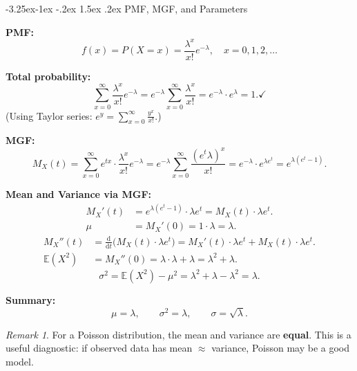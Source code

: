 \documentclass{article}
\makeatletter
\theoremstyle{remark}
\newtheorem*{remark}{Remark}
\newlength{\subsecindent}
\renewcommand\subsection{\@startsection{subsection}{2}{\subsecindent}%
  {-3.25ex\@plus -1ex \@minus -.2ex}%
  {1.5ex \@plus .2ex}%
  {\normalfont\large\bfseries}}
\newenvironment{sub}{%
  \begin{list}{}{%
    \setlength{\leftmargin}{4em}%
    \setlength{\rightmargin}{0pt}%
    \setlength{\topsep}{0pt}%
    \setlength{\partopsep}{0pt}%
    \setlength{\parsep}{\parskip}%
    \setlength{\itemsep}{\parskip}%
  }\item\relax
}{\end{list}}
\newcommand{\E}{\mathbb{E}}
\makeatother
\begin{document}
\subsection{PMF, MGF, and Parameters}
\begin{sub}

\textbf{PMF:}
\begin{equation}
  f(x) = P(X = x) = \frac{\lambda^x}{x!} e^{-\lambda}, \quad x = 0, 1, 2, \ldots
  \label{eq:pois-pmf}
\end{equation}

\textbf{Total probability:}
\[
  \sum_{x=0}^{\infty} \frac{\lambda^x}{x!} e^{-\lambda}
  = e^{-\lambda} \sum_{x=0}^{\infty} \frac{\lambda^x}{x!}
  = e^{-\lambda} \cdot e^{\lambda} = 1. \checkmark
\]
(Using Taylor series: $e^y = \sum_{x=0}^{\infty} \frac{y^x}{x!}$.)

\textbf{MGF:}
\begin{equation}
  M_X(t) = \sum_{x=0}^{\infty} e^{tx} \cdot \frac{\lambda^x}{x!} e^{-\lambda}
         = e^{-\lambda} \sum_{x=0}^{\infty} \frac{(e^t \lambda)^x}{x!}
         = e^{-\lambda} \cdot e^{\lambda e^t}
         = e^{\lambda(e^t - 1)}.
  \label{eq:pois-mgf}
\end{equation}

\textbf{Mean and Variance via MGF:}
\begin{align*}
  M_X'(t) &= e^{\lambda(e^t - 1)} \cdot \lambda e^t = M_X(t) \cdot \lambda e^t. \\
  \mu &= M_X'(0) = 1 \cdot \lambda = \lambda.
\end{align*}
\begin{align*}
  M_X''(t) &= \frac{\mathrm{d}}{\mathrm{d}t}\bigl(M_X(t) \cdot \lambda e^t\bigr)
            = M_X'(t) \cdot \lambda e^t + M_X(t) \cdot \lambda e^t. \\
  \E(X^2) &= M_X''(0) = \lambda \cdot \lambda + \lambda = \lambda^2 + \lambda.
\end{align*}
\[
  \sigma^2 = \E(X^2) - \mu^2 = \lambda^2 + \lambda - \lambda^2 = \lambda.
\]

\textbf{Summary:}
\begin{equation}
  \boxed{\mu = \lambda, \qquad \sigma^2 = \lambda, \qquad \sigma = \sqrt{\lambda}.}
  \label{eq:pois-params}
\end{equation}

\begin{remark}
  For a Poisson distribution, the mean and variance are \textbf{equal}.
  This is a useful diagnostic: if observed data has mean $\approx$ variance,
  Poisson may be a good model.
\end{remark}

\end{sub}
\end{document}
